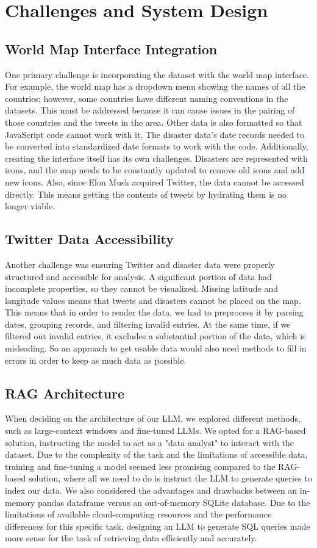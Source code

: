 \documentclass{ieeeaccess}
\begin{document}
\section{Challenges and System Design}
\label{sec:challenges}

\subsection{World Map Interface Integration}
One primary challenge is incorporating the dataset with the world map interface. For example, the world map has a dropdown menu showing the names of all the countries; however, some countries have different naming conventions in the datasets. This must be addressed because it can cause issues in the pairing of those countries and the tweets in the area. Other data is also formatted so that JavaScript code cannot work with it. The disaster data's date records needed to be converted into standardized date formats to work with the code. Additionally, creating the interface itself has its own challenges. Disasters are represented with icons, and the map needs to be constantly updated to remove old icons and add new icons. Also, since Elon Musk acquired Twitter, the data cannot be accessed directly. This means getting the contents of tweets by hydrating them is no longer viable.

\subsection{Twitter Data Accessibility}
Another challenge was ensuring Twitter and disaster data were properly structured and accessible for analysis. A significant portion of data had incomplete properties, so they cannot be visualized. Missing latitude and longitude values means that tweets and disasters cannot be placed on the map. This means that in order to render the data, we had to preprocess it by parsing dates, grouping records, and filtering invalid entries. At the same time, if we filtered out invalid entries, it excludes a substantial portion of the data, which is misleading. So an approach to get usable data would also need methods to fill in errors in order to keep as much data as possible.

\subsection{RAG Architecture}
When deciding on the architecture of our LLM, we explored different methods, such as large-context windows and fine-tuned LLMs. We opted for a RAG-based solution, instructing the model to act as a "data analyst" to interact with the dataset. Due to the complexity of the task and the limitations of accessible data, training and fine-tuning a model seemed less promising compared to the RAG-based solution, where all we need to do is instruct the LLM to generate queries to index our data. We also considered the advantages and drawbacks between an in-memory pandas dataframe versus an out-of-memory SQLite database. Due to the limitations of available cloud-computing resources and the performance differences for this specific task, designing an LLM to generate SQL queries made more sense for the task of retrieving data efficiently and accurately.
\end{document}
